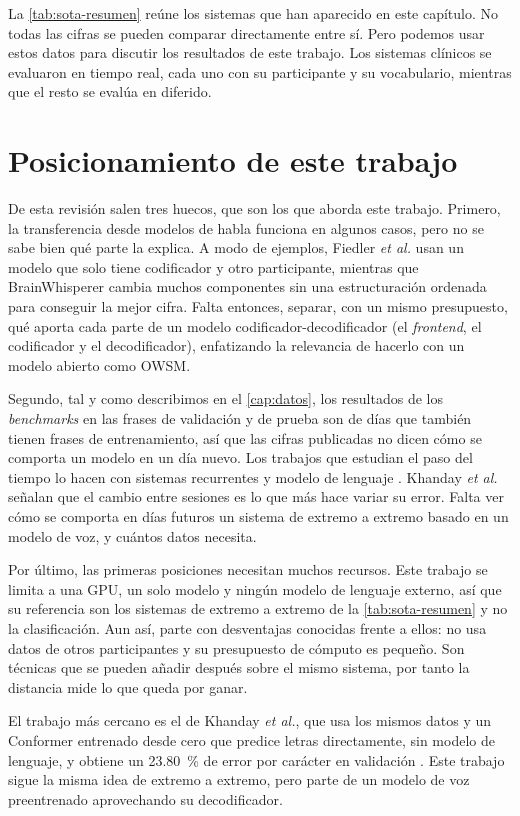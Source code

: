 La \cref{tab:sota-resumen} reúne los sistemas que han aparecido en este capítulo. No todas las cifras se pueden comparar directamente entre sí. Pero podemos usar estos datos para discutir los resultados de este trabajo. Los sistemas clínicos se evaluaron en tiempo real, cada uno con su participante y su vocabulario, mientras que el resto se evalúa en diferido. 

\section{Posicionamiento de este trabajo}
\label{sec:sota-posicionamiento}

De esta revisión salen tres huecos, que son los que aborda este trabajo. Primero, la transferencia desde modelos de habla funciona en algunos casos, pero no se sabe bien qué parte la explica. A modo de ejemplos, Fiedler \textit{et al.} usan un modelo que solo tiene codificador y otro participante, mientras que BrainWhisperer cambia muchos componentes sin una estructuración ordenada para conseguir la mejor cifra. Falta entonces, separar, con un mismo presupuesto, qué aporta cada parte de un modelo codificador-decodificador (el \textit{frontend}, el codificador y el decodificador), enfatizando la relevancia de hacerlo con un modelo abierto como OWSM.

Segundo, tal y como describimos en el \cref{cap:datos}, los resultados de los \textit{benchmarks} en las frases de validación y de prueba son de días que también tienen frases de entrenamiento, así que las cifras publicadas no dicen cómo se comporta un modelo en un día nuevo. Los trabajos que estudian el paso del tiempo lo hacen con sistemas recurrentes y modelo de lenguaje \cite{fan2023corp}. Khanday \textit{et al.} señalan que el cambio entre sesiones es lo que más hace variar su error. Falta ver cómo se comporta en días futuros un sistema de extremo a extremo basado en un modelo de voz, y cuántos datos necesita.

Por último, las primeras posiciones necesitan muchos recursos. Este trabajo se limita a una GPU, un solo modelo y ningún modelo de lenguaje externo, así que su referencia son los sistemas de extremo a extremo de la \cref{tab:sota-resumen} y no la clasificación. Aun así, parte con desventajas conocidas frente a ellos: no usa datos de otros participantes y su presupuesto de cómputo es pequeño. Son técnicas que se pueden añadir después sobre el mismo sistema, por tanto la distancia mide lo que queda por ganar.

El trabajo más cercano es el de Khanday \textit{et al.}, que usa los mismos datos y un Conformer entrenado desde cero que predice letras directamente, sin modelo de lenguaje, y obtiene un \SI{23.80}{\percent} de error por carácter en validación \cite{khanday2026}. Este trabajo sigue la misma idea de extremo a extremo, pero parte de un modelo de voz preentrenado aprovechando su decodificador.

